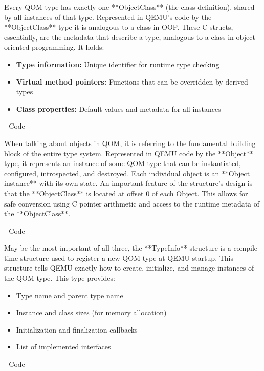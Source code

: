 Every QOM type has exactly one **ObjectClass** (the class definition), shared 
by all instances of that type. Represented in QEMU's code by the **ObjectClass** 
type it is analogous to a class in OOP. These C structs, essentially, are the metadata 
that describe a type, analogous to a class in object-oriented programming. It holds:

\begin{itemize}
    \item \textbf{Type information:} Unique identifier for runtime type checking
    \item \textbf{Virtual method pointers:} Functions that can be overridden by derived types
    \item \textbf{Class properties:} Default values and metadata for all instances
\end{itemize}

- Code

When talking about objects in QOM, it is referring to the fundamental building 
block of the entire type system. Represented in QEMU code by the **Object** type, 
it represents an instance of some QOM type that can be instantiated, 
configured, introspected, and destroyed. Each individual object is an **Object instance** with 
its own state. An important feature of the structure's design is that the **ObjectClass** 
is located at offset 0 of each Object. This allows for safe conversion using 
C pointer arithmetic and access to the runtime metadata of the **ObjectClass**.

- Code

May be the most important of all three, the **TypeInfo** structure is a compile-time 
structure used to register a new QOM type at QEMU startup. This structure 
tells QEMU exactly how to create, initialize, and manage instances of the QOM 
type. This type provides:

\begin{itemize}
    \item Type name and parent type name
    \item Instance and class sizes (for memory allocation)
    \item Initialization and finalization callbacks
    \item List of implemented interfaces
\end{itemize}

- Code